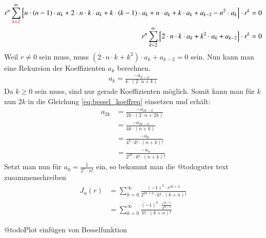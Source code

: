 \begin{refsection}
\begin{align*}
	r^n
	\sum_{\textcolor{red}{k=2}}^{\infty}
	\left[ n \cdot \left( n - 1 \right) \cdot a_k
	+
	2 \cdot n \cdot k \cdot a_k
	+
	k \cdot \left( k - 1 \right) \cdot a_k
	+
	n \cdot a_k
	+
	k \cdot a_k
	+
	a_{k-2}
	-
	n^2 \cdot a_k
	\right]
	\cdot r^k
	= 0 \\
	r^n
	\sum_{k=2}^{\infty}
	\left[
	2 \cdot n \cdot k \cdot a_k
	+
	k^2 \cdot a_k
	+
	a_{k - 2}
	\right]
	\cdot r^k
	= 0
\end{align*}
Weil $r \neq 0$ sein muss, muss $ \left( 2 \cdot n \cdot k + k^2 \right) \cdot a_k + a_{k - 2} = 0$ sein.
Nun kann man eine Rekursion der Koeffizienten $a_k$ berechnen.
\begin{align}
	a_k
	=
	\frac
	{
		-a_{k - 2}
	}{
		k \cdot \left( 2 \cdot n + k \right)	
	}
	\label{eq:bessel_koeffreq}
\end{align}
Da $k \geq 0$ sein muss, sind nur gerade Koeffizienten m\"oglich. Somit kann man f\"ur $k$ nun $2k$ in die Gleichung \ref{eq:bessel_koeffreq} einsetzen und erh\"alt:
\begin{align*}
	a_{2k}
	&=
	\frac
	{
		-a_{2k - 2}
	}{
		2k \cdot \left( 2 \cdot n + 2k \right)	
	} \\
	&=
	\frac
	{
		-a_{2k - 2}
	}{
		4k \cdot \left( n + k \right)	
	} \\
	&=
	\frac
	{
		-a_0
	}{
		4^k \cdot {k}! \cdot {\left( n + k \right)}!
	} \\
	&=
	\frac
	{
		-a_0
	}{
		2^{2k} \cdot {k}! \cdot {\left( n + k \right)}!
	}
\end{align*}
Setzt man nun f\"ur $a_0 = \frac{1}{2^n \cdot {n}!}$ ein, so bekommt man die @todo{guter text zusammenschreiben}
\begin{align}
	J_n \left( r \right)
	&= \nonumber
	\sum_{k=0} ^{\infty}
	\frac
	{
		\left( - 1 \right) ^k \cdot r ^{2k+n}
	}{
		2^{2k+n} \cdot {k}! \cdot { \left( k + n \right) }!
	} \\
	&=
	\sum_{k=0} ^{\infty}
	\frac
	{
		\left( - 1 \right) ^k \cdot 
		\frac
		{
			r ^{2k+n}
		}{
			2^{2k+n}
		}
	}{
		{k}! \cdot { \left( k + n \right) }!
	}
	\label{eq:bessel_summenformel}
\end{align}

@todo{Plot einf\"ugen von Besselfunktion}

\printbibliography[heading=subbibliography]
\end{refsection}

